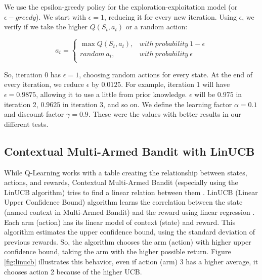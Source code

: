 We use the epsilon-greedy policy for the exploration-exploitation model (or $\epsilon-greedy$). We start with $\epsilon = 1$, reducing it for every new iteration. Using $\epsilon$, we verify if we take the higher $Q(S_t, a_t)$ or a random action:

\begin{equation}
    a_t = \begin{cases}
        \max Q(S_t, a_t), & with\ probability\ 1 - \epsilon \\
        random\ a_t, & with\ probability\ \epsilon \\
    \end{cases}
\end{equation}

So, iteration 0 has $\epsilon = 1$, choosing random actions for every state. At the end of every iteration, we reduce $\epsilon$ by $0.0125$. For example, iteration 1 will have $\epsilon = 0.9875$, allowing it to use a little from prior knowledge. $\epsilon$ will be $0.975$ in iteration 2, $0.9625$ in iteration 3, and so on. We define the learning factor $\alpha = 0.1$ and discount factor $\gamma = 0.9$. These were the values with better results in our different tests.

\subsection{Contextual Multi-Armed Bandit with LinUCB}

While Q-Learning works with a table creating the relationship between states, actions, and rewards, Contextual Multi-Armed Bandit (especially using the LinUCB algorithm) tries to find a linear relation between them \cite{li2010contextual}. LinUCB (Linear Upper Confidence Bound) algorithm learns the correlation between the state (named context in Multi-Armed Bandit) and the reward using linear regression \cite{delande2021horizontal}. Each arm (action) has its linear model of context (state) and reward. This algorithm estimates the upper confidence bound, using the standard deviation of previous rewards. So, the algorithm chooses the arm (action) with higher upper confidence bound, taking the arm with the higher possible return. Figure \ref{fig:linucb} illustrates this behavior, even if action (arm) 3 has a higher average, it chooses action 2 because of the higher UCB.

